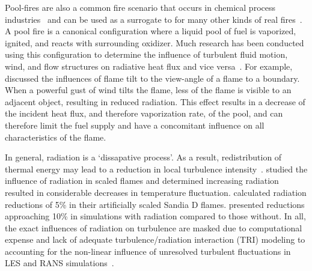 Pool-fires are also a common fire scenario that occurs in chemical process industries~\cite{Miao2014AccidentDike} and can be used as a surrogate to for many other kinds of real fires~\cite{Chen2023PoolAdvances}. A pool fire is a canonical configuration where a liquid pool of fuel is vaporized, ignited, and reacts with surrounding oxidizer. Much research has been conducted using this configuration to determine the influence of turbulent fluid motion, wind, and flow structures on radiative heat flux and vice versa~\cite{Chen2023PoolAdvances}.
For example,~\citet{Hu2017AChallenges} discussed the influences of flame tilt to the view-angle of a flame to a boundary. When a powerful gust of wind tilts the flame, less of the flame is visible to an adjacent object, resulting in reduced radiation. This effect results in a decrease of the incident heat flux, and therefore vaporization rate, of the pool, and can therefore limit the fuel supply and have a concomitant influence on all characteristics of the flame.


In general, radiation is a `dissapative process'. As a result, redistribution of thermal energy may lead to a reduction in local turbulence intensity~\cite{Modest2016RadiativeSystems}. \citet{Li2002InvestigationMethod.} studied the influence of radiation in scaled flames and determined increasing radiation resulted in considerable decreases in temperature fluctuation. \citet{Wang2008MonteFlames} calculated radiation reductions of 5\% in their artificially scaled Sandia D flames. \citet{Consalvi2012InfluenceFires} presented reductions approaching 10\% in simulations with radiation compared to those without. In all, the exact influences of radiation on turbulence are masked due to computational expense and lack of adequate turbulence/radiation interaction (TRI) modeling to accounting for the non-linear influence of unresolved turbulent fluctuations in LES and RANS simulations~\cite{Modest2016RadiativeSystems}.



